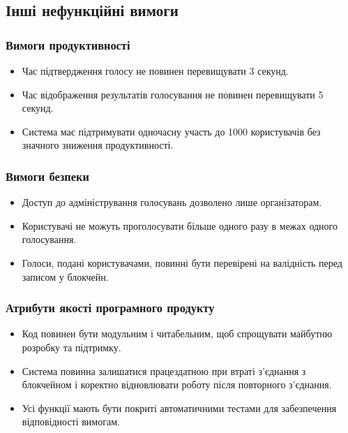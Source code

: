 \documentclass[14pt]{extreport}
\begin{document}
  \subsection{Інші нефункційні вимоги}
  \subsubsection{Вимоги продуктивності}
  \begin{itemize}
    \item Час підтвердження голосу не повинен перевищувати 3 секунд.  
    \item Час відображення результатів голосування не повинен перевищувати 5 секунд.  
    \item Система має підтримувати одночасну участь до 1000 користувачів без значного зниження продуктивності.  
  \end{itemize}

  \subsubsection{Вимоги безпеки}
  \begin{itemize}
    \item Доступ до адміністрування голосувань дозволено лише організаторам.
    \item Користувачі не можуть проголосувати більше одного разу в межах одного голосування.
    \item Голоси, подані користувачами, повинні бути перевірені на валідність перед записом у блокчейн.
  \end{itemize}
  
  \subsubsection{Атрибути якості програмного продукту}
  \begin{itemize}  
    \item Код повинен бути модульним і читабельним, щоб спрощувати майбутню розробку та підтримку.  
    \item Система повинна залишатися працездатною при втраті з'єднання з блокчейном і коректно відновлювати роботу після повторного з'єднання.  
    \item Усі функції мають бути покриті автоматичними тестами для забезпечення відповідності вимогам.  
  \end{itemize}

 
\end{document}
